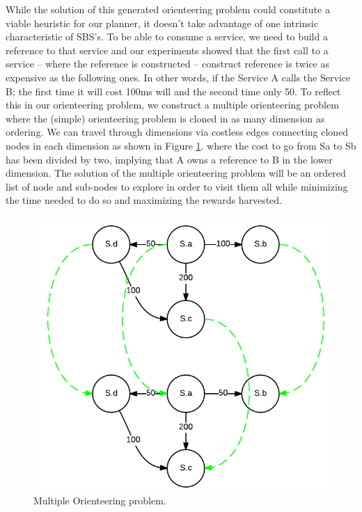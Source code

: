 \documentclass[lnbip]{svmultln}
\begin{document}
While the solution of this generated orienteering problem could constitute a viable heuristic for our planner, it doesn't take advantage of one intrinsic characteristic of SBS’s. To be able to consume a service, we need to build a reference to that service and our experiments showed that the first call to a service -- where the reference is constructed --  construct reference is twice as expensive as the following ones. In other words, if the Service A calls  the Service B; the first time it will cost 100ms will and the second time only 50. To reflect this in our orienteering problem, we construct a multiple orienteering problem where the (simple) orienteering problem is cloned in as many dimension as ordering. We can travel through dimensions via costless edges connecting cloned nodes in each dimension as shown in Figure \ref{fig:multiple_orienteering}. where the cost to go from Sa to Sb has been divided by two, implying that A owns a reference to B in the lower dimension. 
The solution of the multiple orienteering problem will be an ordered list of node and sub-nodes to explore in order to visit them all while minimizing the time needed to do so and maximizing the rewards harvested. 

\begin{figure}
    \centering
	\includegraphics[scale=0.35]{multiple_orienteering.png}
 	\caption{Multiple Orienteering problem.}
    \label{fig:multiple_orienteering}
\end{figure}
\end{document}
